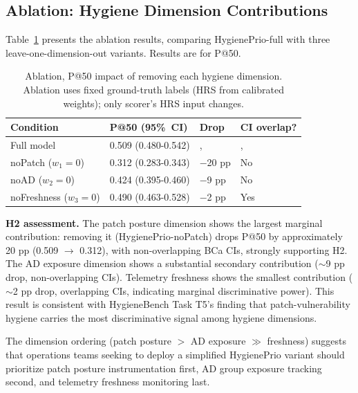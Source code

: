 \subsection{Ablation: Hygiene Dimension Contributions}

Table~\ref{tab:ablation} presents the ablation results, comparing HygienePrio-full with three leave-one-dimension-out variants. Results are for P@50.

\begin{table}[!t]
 \caption{Ablation, P@50 impact of removing each hygiene dimension. Ablation uses fixed ground-truth labels (HRS from calibrated weights); only scorer's HRS input changes.}
 \label{tab:ablation}
 \centering
 \small
 \setlength{\tabcolsep}{3pt}
 \begin{tabular}{>{\raggedright}p{2.5cm}
 >{\raggedright}p{2.0cm}
 >{\raggedright}p{1.2cm}
 >{\raggedright\arraybackslash}p{1.1cm}}
 \toprule
 \textbf{Condition} & \textbf{P@50 (95\%~CI)} & \textbf{Drop} & \textbf{CI overlap?} \\
 \midrule
 Full model & 0.509 (0.480-0.542) &, &, \\
 noPatch ($w_1{=}0$)& 0.312 (0.283-0.343) & $-$20 pp & No \\
 noAD ($w_2{=}0$) & 0.424 (0.395-0.460) & $-$9 pp & No \\
 noFreshness ($w_3{=}0$) & 0.490 (0.463-0.528) & $-$2 pp & Yes \\
 \bottomrule
 \end{tabular}
\end{table}

\textbf{H2 assessment.} The patch posture dimension shows the largest marginal contribution: removing it (HygienePrio-noPatch) drops P@50 by approximately 20 pp (0.509 $\to$ 0.312), with non-overlapping BCa CIs, strongly supporting H2. The AD exposure dimension shows a substantial secondary contribution ($\sim$9 pp drop, non-overlapping CIs). Telemetry freshness shows the smallest contribution ($\sim$2 pp drop, overlapping CIs, indicating marginal discriminative power). This result is consistent with HygieneBench Task T5's finding that patch-vulnerability hygiene carries the most discriminative signal among hygiene dimensions.

The dimension ordering (patch posture $>$ AD exposure $\gg$ freshness) suggests that operations teams seeking to deploy a simplified HygienePrio variant should prioritize patch posture instrumentation first, AD group exposure tracking second, and telemetry freshness monitoring last.

